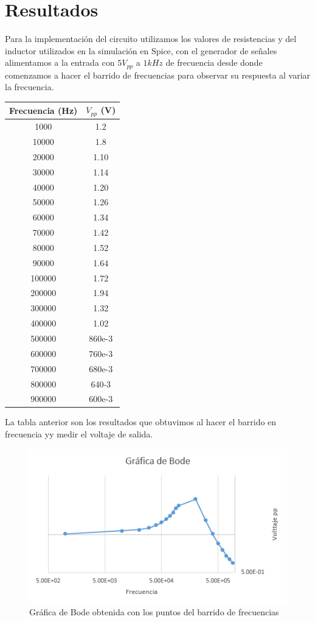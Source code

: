 \documentclass[letterpaper,10pt]{article}
\begin{document}
\section{Resultados}
Para la implementación del circuito utilizamos los valores de resistencias y del inductor utilizados en la simulación en Spice, con el generador de señales alimentamos a la entrada con $5V_{pp}$ a $1kHz$ de frecuencia desde donde comenzamos a hacer el barrido de frecuencias para observar su respuesta al variar la frecuencia.
\begin{center}
	\begin{tabular}{|c|c|}
	\hline 
	Frecuencia (Hz) &  $V_{pp}$ (V) \\ 
	\hline 
	1000 & 1.2 \\ 
	\hline 
	10000 & 1.8 \\ 
	\hline 
	20000 & 1.10 \\ 
	\hline 
	30000 & 1.14 \\ 
	\hline 
	40000 & 1.20 \\ 
	\hline 
	50000 & 1.26 \\ 
	\hline 
	60000 & 1.34 \\ 
	\hline 
	70000 & 1.42 \\ 
	\hline 
	80000 & 1.52 \\ 
	\hline 
	90000 & 1.64 \\ 
	\hline 
	100000 & 1.72 \\ 
	\hline 
	200000 & 1.94 \\ 
	\hline 
	300000 & 1.32 \\ 
	\hline 
	400000 & 1.02 \\ 
	\hline 
	500000 & 860e-3 \\ 
	\hline 
	600000 & 760e-3 \\ 
	\hline 
	700000 & 680e-3 \\ 
	\hline 
	800000 & 640-3 \\ 
	\hline 
	900000 & 600e-3 \\ 
	\hline 
\end{tabular} 
\end{center}
La tabla anterior son los resultados que obtuvimos al hacer el barrido en frecuencia yy medir el voltaje de salida.
\begin{figure}[h!]
	\centering
	\includegraphics[width=0.7\linewidth]{bode}
	\caption{Gráfica de Bode obtenida con los puntos del barrido de frecuencias}
	\label{fig:bode}
\end{figure}
\end{document}
